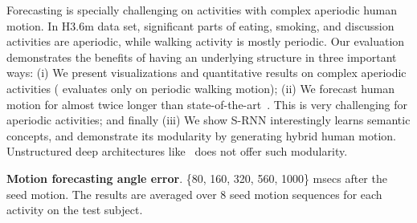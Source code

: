 \documentclass[10pt,twocolumn,letterpaper]{article}
\begin{document}
Forecasting is specially challenging on activities with complex aperiodic human motion. In H3.6m data set, significant parts of eating, smoking, and discussion activities are aperiodic, while walking activity is mostly periodic. Our evaluation demonstrates the benefits of having an underlying structure in three important ways:
(i) We present visualizations and  quantitative results on complex aperiodic activities (\cite{Fragkiadaki15} evaluates only on periodic walking motion); (ii) We forecast human motion for almost twice longer than state-of-the-art~\cite{Fragkiadaki15}. This is very challenging for aperiodic activities; and finally (iii) We show S-RNN interestingly learns semantic concepts, and demonstrate its modularity by generating hybrid human motion. Unstructured deep architectures like~\cite{Fragkiadaki15} does not offer such modularity.
\centering
\caption{\footnotesize{\textbf{Motion forecasting angle error}. \{80, 160, 320, 560, 1000\} msecs after the seed motion. The results are averaged over 8 seed motion sequences for each activity on the test subject.}}%
\vspace{0\captionReduceBot}
\end{document}
